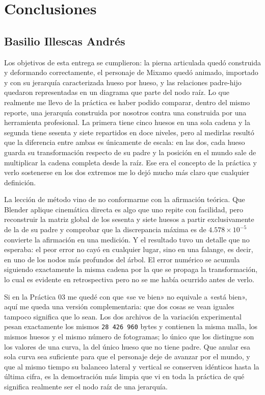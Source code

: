 
\section{Conclusiones}

\subsection{Basilio Illescas Andrés}
Los objetivos de esta entrega se cumplieron: la pierna articulada quedó construida y deformando correctamente, el personaje de Mixamo quedó animado, importado y con su jerarquía caracterizada hueso por hueso, y las relaciones padre-hijo quedaron representadas en un diagrama que parte del nodo raíz. Lo que realmente me llevo de la práctica es haber podido comparar, dentro del mismo reporte, una jerarquía construida por nosotros contra una construida por una herramienta profesional. La primera tiene cinco huesos en una sola cadena y la segunda tiene sesenta y siete repartidos en doce niveles, pero al medirlas resultó que la diferencia entre ambas es únicamente de escala: en las dos, cada hueso guarda su transformación respecto de su padre y la posición en el mundo sale de multiplicar la cadena completa desde la raíz. Ese era el concepto de la práctica y verlo sostenerse en los dos extremos me lo dejó mucho más claro que cualquier definición.

La lección de método vino de no conformarme con la afirmación teórica. Que Blender aplique cinemática directa es algo que uno repite con facilidad, pero reconstruir la matriz global de los sesenta y siete huesos a partir exclusivamente de la de su padre y comprobar que la discrepancia máxima es de $4.578 \times 10^{-5}$ convierte la afirmación en una medición. Y el resultado tuvo un detalle que no esperaba: el peor error no cayó en cualquier lugar, sino en una falange, es decir, en uno de los nodos más profundos del árbol. El error numérico se acumula siguiendo exactamente la misma cadena por la que se propaga la transformación, lo cual es evidente en retrospectiva pero no se me había ocurrido antes de verlo.

Si en la Práctica 03 me quedé con que «se ve bien» no equivale a «está bien», aquí me queda una versión complementaria: que dos cosas se vean iguales tampoco significa que lo sean. Los dos archivos de la variación experimental pesan exactamente los mismos \texttt{28\,426\,960} bytes y contienen la misma malla, los mismos huesos y el mismo número de fotogramas; lo único que los distingue son los valores de una curva, la del único hueso que no tiene padre. Que anular esa sola curva sea suficiente para que el personaje deje de avanzar por el mundo, y que al mismo tiempo su balanceo lateral y vertical se conserven idénticos hasta la última cifra, es la demostración más limpia que vi en toda la práctica de qué significa realmente ser el nodo raíz de una jerarquía.

